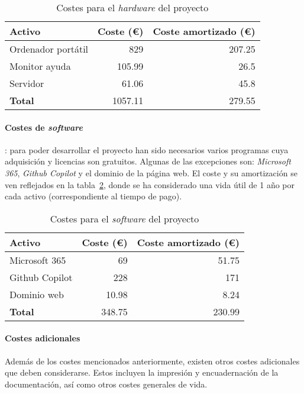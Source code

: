 \begin{table}[H]
	\centering
	\begin{tabular}{lrr}
		\toprule
		\textbf{Activo}      & \textbf{Coste (€)}      & \textbf{Coste amortizado (€)}      \\ \midrule
		Ordenador portátil     & 829                    & 207.25                      \\
		Monitor ayuda			& 105.99 						& 26.5							\\
		Servidor             & 61.06                    &  45.8                     \\ \midrule
		\textbf{Total}       & 1057.11                   & 279.55                      \\ \midrule
	\end{tabular}
	\caption{Costes para el \textit{hardware} del proyecto}
	\label{tabla:hw}
\end{table}

\paragraph{Costes de \textit{software}}: para poder desarrollar el proyecto han sido necesarios varios programas cuya adquisición y licencias son gratuitos. Algunas de las excepciones son: \textit{Microsoft 365}, \textit{Github Copilot} y el dominio de la página web. El coste y su amortización se ven reflejados en la tabla~\ref{tabla:sw}, donde se ha considerado una vida útil de 1 año por cada activo (correspondiente al tiempo de pago).

\begin{table}[H]
	\centering
	\begin{tabular}{lrr}
		\toprule
		\textbf{Activo}      & \textbf{Coste (€)}      & \textbf{Coste amortizado (€)}      \\ \midrule
		Microsoft 365     & 69                    & 51.75                      \\
		Github Copilot			& 228 						& 171							\\
		Dominio web             & 10.98                    & 8.24                     \\ \midrule
		\textbf{Total}       & 348.75                   & 230.99                      \\ \midrule
	\end{tabular}
	\caption{Costes para el \textit{software} del proyecto}
	\label{tabla:sw}
\end{table}

\paragraph{Costes adicionales} Además de los costes mencionados anteriormente, existen otros costes adicionales que deben considerarse. Estos incluyen la impresión y encuadernación de la documentación, así como otros costes generales de vida. 

